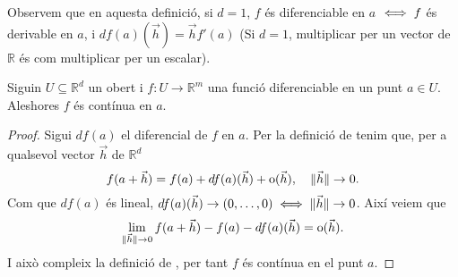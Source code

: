 \documentclass[../Apunts.tex]{subfiles}
\begin{document}
	\begin{observation}
		Observem que en aquesta definició, si \(d=1\), \(f\) és diferenciable en \(a\) \(\iff f\) és derivable en \(a\), i \(df(a)(\vec{h})=\vec{h}f'(a)\) (Si \(d=1\), multiplicar per un vector de \(\mathbb{R}\) és com multiplicar per un escalar).
	\end{observation}
	\begin{proposition}
		\label{prop:Diferenciable implica contínua}
		Siguin \(U\subseteq\mathbb{R}^{d}\) un obert i \(f\colon U\to\mathbb{R}^{m}\) una funció diferenciable en un punt \(a\in U\). Aleshores \(f\) és contínua en \(a\).
		\begin{proof}
			Sigui \(df(a)\) el diferencial de \(f\) en \(a\). Per la definició de  tenim que, per a qualsevol vector \(\vec{h}\) de \(\mathbb{R}^d\)
			\[f(a+\vec{h})=f(a)+df(a)(\vec{h})+\operatorname{o}(\vec{h}),\quad \lVert\vec{h}\rVert\to0.\]
			Com que \(df(a)\) és lineal, \(df(a)(\vec{h})\to(0,\dots,0)\iff\lVert\vec{h}\rVert\to0\). Així veiem que
			\[\lim_{\lVert\vec{h}\rVert\to0}f(a+\vec{h})-f(a)-df(a)(\vec{h})=\operatorname{o}(\vec{h}).\]
			I això compleix la definició de , per tant \(f\) és contínua en el punt \(a\).
		\end{proof}
	\end{proposition}
\end{document}
